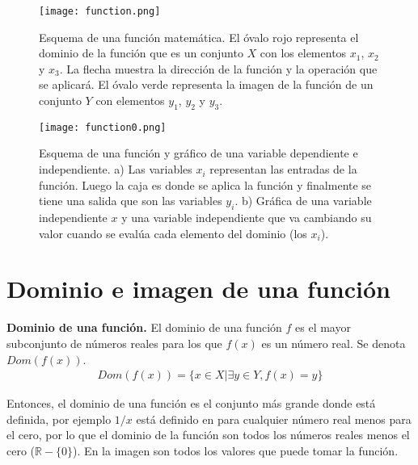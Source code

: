 \begin{center}
\begin{figure}[h!]
\centering
\texttt{[image: function.png]}
\caption[Esquema de una función matemática.]{Esquema de una función matemática. El óvalo rojo representa el dominio de la función que es un conjunto $X$ con los elementos $x_{1}$, $x_{2}$ y $x_{3}$. La flecha muestra la dirección de la función y la operación que se aplicará. El óvalo verde representa la imagen de la función de un conjunto $Y$ con elementos $y_{1}$, $y_{2}$ y $y_{3}$.}
\label{fn00}
\end{figure}
\end{center}

\begin{center}
\begin{figure}[h!]
\centering
\texttt{[image: function0.png]}
\caption[Esquema de una función y gráfico de una variable dependiente e independiente.]{Esquema de una función y gráfico de una variable dependiente e independiente. a) Las variables $x_{i}$ representan las entradas de la función. Luego la caja es donde se aplica la función y finalmente se tiene una salida que son las variables $y_{i}$. b) Gráfica de una variable independiente $x$ y una variable independiente que va cambiando su valor cuando se evalúa cada elemento del dominio (los $x_{i}$).}
\label{imagfx}
\end{figure}
\end{center}

\section{Dominio e imagen de una función}
\label{domim}
\begin{mydef}
\textbf{Dominio de una función.} El dominio de una función $f$ es el mayor subconjunto de números reales para los que $f(x)$ es un número real. Se denota $Dom(f(x))$.
\begin{eqnarray}
Dom(f(x))=\{x\in X|\exists y \in Y,f(x)=y\}
\end{eqnarray}
\label{domfx}
\end{mydef}
Entonces, el dominio de una función es el conjunto más grande donde está definida, por ejemplo $1/x$ está definido en para cualquier número real menos para el cero, por lo que el dominio de la función son todos los números reales menos el cero ($\mathbb{R}-\{0\}$). En la imagen son todos los valores que puede tomar la función.

